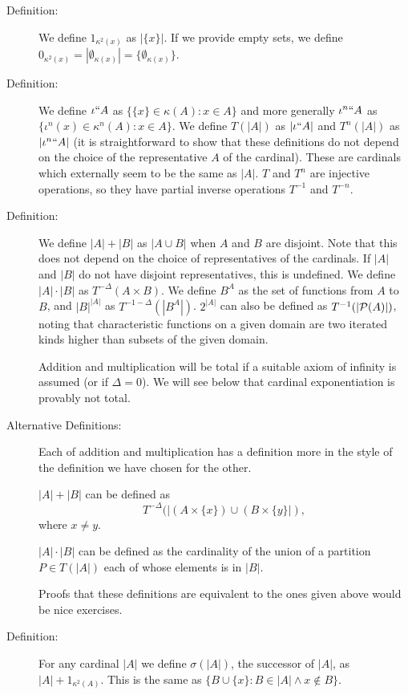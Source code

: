 \documentclass[12pt]{article}
\begin{document}
\begin{description}

\item[Definition:]   We define $1_{\kappa^2(x)}$ as $|\{x\}|$.  If we provide empty sets, we define $0_{\kappa^2(x)}= |\emptyset_{\kappa(x)}| = \{\emptyset_{\kappa(x)}\}$.

\item[Definition:]  We define $\iota``A$ as $\{\{x\}\in \kappa(A):x \in A\}$ and more generally $\iota^n``A$ as $\{\iota^n(x)\in \kappa^n(A):x \in A\}$.  We define $T(|A|)$ as $|\iota``A|$ and $T^n(|A|)$ as $|\iota^n``A|$ (it is straightforward to show that these definitions do not depend on the choice of the representative $A$ of the cardinal).  These are cardinals which externally seem to be the same as $|A|$.  $T$ and $T^n$ are injective operations, so they have partial inverse operations $T^{-1}$ and $T^{-n}$.

\item[Definition:]  We define $|A|+|B|$ as $|A \cup B|$ when $A$ and $B$ are disjoint.  Note that this does not depend on the choice of representatives of the cardinals.  If $|A|$ and $|B|$ do not have disjoint representatives, this is undefined.  We define $|A|\cdot|B|$ as $T^{-\Delta}(A \times B)$.   We define $B^A$ as the set of functions from $A$ to $B$, and $|B|^{|A|}$ as $T^{-1-\Delta}(|B^A|)$.  $2^{|A|}$ can also be defined as $T^{-1}(|{\cal P}(A)|)$, noting that characteristic functions on a given domain are two iterated kinds higher than subsets of the given domain. 

 Addition and multiplication will be total if a suitable axiom of infinity is assumed (or if $\Delta=0$).  We will see below that cardinal exponentiation is provably not total.

\item[Alternative Definitions:]  Each of addition and multiplication has a definition more in the style of the definition we have chosen for the other.


$|A|+|B|$ can be defined as $$T^{-\Delta}(|(A \times \{x\})\cup(B \times \{y\}|),$$ where $x \neq y$.  

$|A|\cdot|B|$ can be defined as the cardinality of the union of a partition $P \in T(|A|)$ each of whose elements is in $|B|$.

Proofs that these definitions are equivalent to the ones given above would be nice exercises.

\item[Definition:]  For any cardinal $|A|$ we define $\sigma(|A|)$, the successor of $|A|$, as $|A|+1_{\kappa^2(A)}$.
This is the same as $\{B \cup \{x\}:B \in |A| \wedge x \not\in B\}$.


\end{description}
\end{document}
